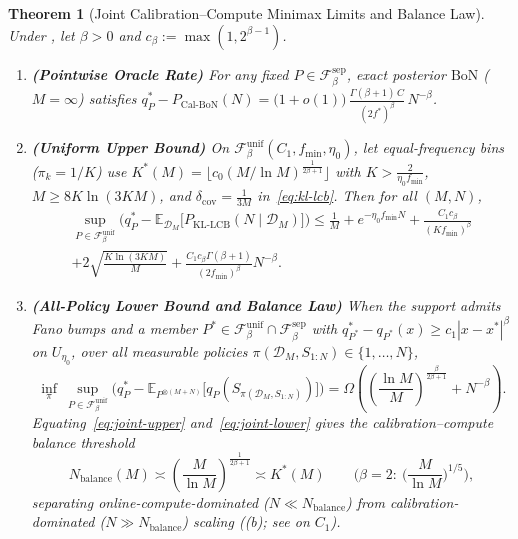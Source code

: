 \documentclass{article}
\theoremstyle{plain}
\newtheorem{theorem}{Theorem}
\theoremstyle{definition}
\theoremstyle{remark}
\newcommand{\E}{\mathbb{E}}
\begin{document}
\begin{theorem}[Joint Calibration--Compute Minimax Limits and Balance Law]
\label{thm:joint-minimax}
Under , let $\beta > 0$ and $c_\beta := \max(1, 2^{\beta-1})$.
\begin{enumerate}[leftmargin=1.6em,itemsep=2pt,topsep=1pt]
    \item \textbf{(Pointwise Oracle Rate)} For any fixed $P \in \mathcal{F}_\beta^{\mathrm{sep}}$, exact posterior $\mathrm{BoN}$ ($M = \infty$) satisfies $q^*_P - P_{\mathrm{Cal\text{-}BoN}}(N) = \big(1 + o(1)\big)\,\frac{\Gamma(\beta + 1)\,C}{(2 f^*)^\beta}\,N^{-\beta}$.
    \item \textbf{(Uniform Upper Bound)} On $\mathcal{F}_\beta^{\mathrm{unif}}(C_1, f_{\min}, \eta_0)$, let equal-frequency bins ($\pi_k = 1/K$) use $K^*(M) = \lfloor c_0 (M/\ln M)^{\frac{1}{2\beta+1}}\rfloor$ with $K > \frac{2}{\eta_0 f_{\min}}$, $M \ge 8 K \ln(3KM)$, and $\delta_{\mathrm{cov}} = \frac{1}{3M}$ in~\eqref{eq:kl-lcb}. Then for all $(M, N)$,
    \begin{multline}
    \label{eq:joint-upper}
    \sup_{P \in \mathcal{F}_\beta^{\mathrm{unif}}}\Big(q^*_P - \E_{\mathcal{D}_M}\big[P_{\mathrm{KL\text{-}LCB}}(N \mid \mathcal{D}_M)\big]\Big)
    \le \frac{1}{M} + e^{-\eta_0 f_{\min} N} + \frac{C_1 c_\beta}{(K f_{\min})^\beta} \\
    + 2\sqrt{\frac{K\ln(3KM)}{M}} + \frac{C_1 c_\beta \Gamma(\beta+1)}{(2 f_{\min})^\beta}N^{-\beta}.
    \end{multline}
    \item \textbf{(All-Policy Lower Bound and Balance Law)} When the support admits Fano bumps and a member $P^* \in \mathcal{F}_\beta^{\mathrm{unif}} \cap \mathcal{F}_\beta^{\mathrm{sep}}$ with $q^*_{P^*} - q_{P^*}(x) \ge c_1|x-x^*|^\beta$ on $U_{\eta_0}$, over all measurable policies $\pi(\mathcal{D}_M, S_{1:N}) \in \{1,\dots,N\}$,
    \begin{equation}
    \label{eq:joint-lower}
    \inf_{\pi}\ \sup_{P \in \mathcal{F}_\beta^{\mathrm{unif}}}\Big(q^*_P - \E_{P^{\otimes(M+N)}}\big[q_P(S_{\pi(\mathcal{D}_M, S_{1:N})})\big]\Big)
    = \Omega\!\left(\left(\frac{\ln M}{M}\right)^{\frac{\beta}{2\beta+1}} + N^{-\beta}\right).
    \end{equation}
    Equating~\eqref{eq:joint-upper} and~\eqref{eq:joint-lower} gives the \emph{calibration--compute balance threshold}
    \begin{equation}
    \label{eq:n-balance}
    N_{\mathrm{balance}}(M) \asymp \left(\frac{M}{\ln M}\right)^{\frac{1}{2\beta+1}} \asymp K^*(M) \qquad \Big(\beta=2:\ \Big(\frac{M}{\ln M}\Big)^{1/5}\Big),
    \end{equation}
    separating online-compute-dominated ($N \ll N_{\mathrm{balance}}$) from calibration-dominated ($N \gg N_{\mathrm{balance}}$) scaling ((b); see  on $C_1$).
\end{enumerate}
\end{theorem}
\end{document}
